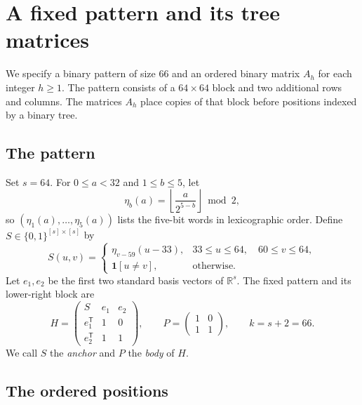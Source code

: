 \section{A fixed pattern and its tree matrices}
\label{sec:construction}

We specify a binary pattern of size $66$ and an ordered binary matrix
$A_h$ for each integer $h\ge1$.  The pattern consists of a $64\times64$
block and two additional rows and columns.  The matrices $A_h$ place
copies of that block before positions indexed by a binary tree.

\subsection{The pattern}

Set $s=64$.  For $0\le a<32$ and $1\le b\le5$, let
\[
 \eta_b(a)=\left\lfloor\frac{a}{2^{5-b}}\right\rfloor\bmod2,
\]
so $(\eta_1(a),\ldots,\eta_5(a))$ lists the five-bit words in
lexicographic order.  Define $S\in\{0,1\}^{[s]\times[s]}$ by
\[
 S(u,v)=
 \begin{cases}
  \eta_{v-59}(u-33),&33\le u\le64,\quad60\le v\le64,\\
  \mathbf1[u\ne v],&\text{otherwise}.
 \end{cases}
\]
Let $e_1,e_2$ be the first two standard basis vectors of $\mathbb R^s$.
The fixed pattern and its lower-right block are
\begin{equation}
 H=
 \begin{pmatrix}
  S&e_1&e_2\\
  e_1^{\mathsf T}&1&0\\
  e_2^{\mathsf T}&1&1
 \end{pmatrix},
 \qquad
 P=\begin{pmatrix}1&0\\1&1\end{pmatrix},
 \qquad k=s+2=66.
 \label{eq:pattern-definition}
\end{equation}
We call $S$ the \emph{anchor} and $P$ the \emph{body} of $H$.

\subsection{The ordered positions}

